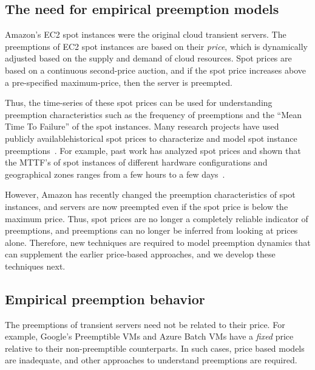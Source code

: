 \subsection{The need for empirical preemption models}
\label{subsec:need-for-empirical}

Amazon's EC2 spot instances were the original cloud transient servers.
The preemptions of EC2 spot instances are based on their \emph{price}, which is dynamically adjusted based on the supply and demand of cloud resources.
Spot prices are based on a continuous second-price auction, and if the spot price increases above a pre-specified maximum-price, then the server is preempted.

Thus, the time-series of these spot prices can be used for understanding preemption characteristics such as the frequency of preemptions and the ``Mean Time To Failure'' of the spot instances.
Many research projects have used publicly available\footnotemark historical spot prices to characterize and model spot instance preemptions~\cite{spotcheck,how-to-bid}. %
For example, past work has analyzed spot prices and shown that the MTTF's of spot instances of different hardware configurations and geographical zones ranges from a few hours to a few days~\cite{prateek-thesis, shastri-thesis}. 



However, Amazon has recently changed the preemption characteristics of spot instances, and servers are now preempted even if the spot price is below the maximum price.
Thus, spot prices are no longer a completely reliable indicator of preemptions, and preemptions can no longer be inferred from looking at prices alone.
Therefore, new techniques are required to model preemption dynamics that can supplement the earlier price-based approaches, and we develop these techniques next.


\subsection{Empirical preemption behavior}

The preemptions of transient servers need not be related to their price.
For example, Google's Preemptible VMs and Azure Batch VMs have a \emph{fixed} price relative to their non-preemptible counterparts. 
In such cases, price based models are inadequate, and other approaches to understand preemptions are required.

